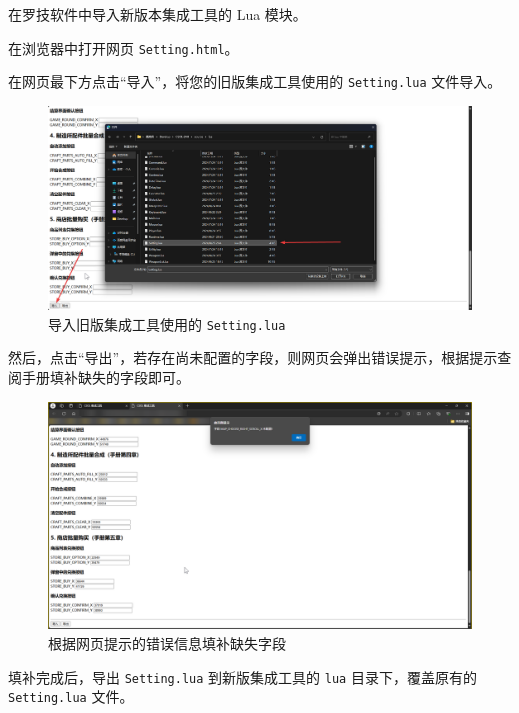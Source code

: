 在罗技软件中导入新版本集成工具的 Lua 模块。

在浏览器中打开网页 \lstinline{Setting.html}。

在网页最下方点击“导入”，将您的旧版集成工具使用的 \lstinline{Setting.lua} 文件导入。

\begin{figure}[H]
    \Centering
    \includegraphics[width=\textwidth]{docs/assets/update/import_setting}
    \caption{导入旧版集成工具使用的 \lstinline{Setting.lua}}
\end{figure}

然后，点击“导出”，若存在尚未配置的字段，则网页会弹出错误提示，根据提示查阅手册填补缺失的字段即可。

\begin{figure}[H]
    \Centering
    \includegraphics[width=\textwidth]{docs/assets/update/export_error}
    \caption{根据网页提示的错误信息填补缺失字段}
\end{figure}

填补完成后，导出 \lstinline{Setting.lua} 到新版集成工具的 \lstinline{lua} 目录下，覆盖原有的 \lstinline{Setting.lua} 文件。

